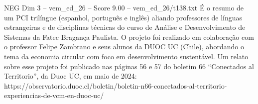 \begin{textsample}{NEG Dim 3 – vem\_ed\_26 – Score 9.00 – vem\_ed\_26/t138.txt}
É o resumo de um PCI trilíngue (espanhol, português e inglês) aliando professores de línguas estrangeiras e de disciplinas técnicas do curso de Análise e Desenvolvimento de Sistemas da Fatec Bragança Paulista.
O projeto foi realizado em colaboração com o professor Felipe Zambrano e seus alunos da DUOC UC (Chile), abordando o tema da economia circular com foco em desenvolvimento sustentável.
Um relato sobre esse projeto foi publicado nas páginas 56 e 57 do boletim 66 “Conectados al Territorio”, da Duoc UC, em maio de 2024: https://observatorio.duoc.cl/boletin/boletin-n66-conectados-al-territorio-experiencias-de-vcm-en-duoc-uc/

\end{textsample}
